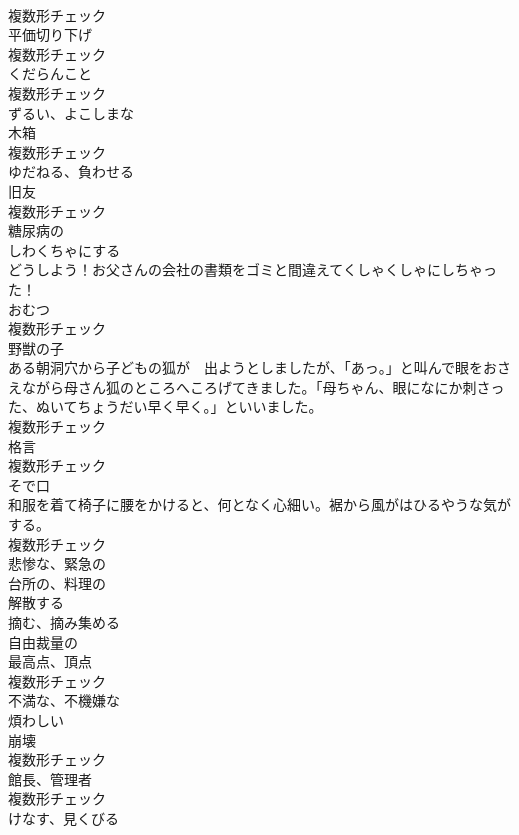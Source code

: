 \documentclass[8pt]{extreport}
\begin{document}
\begin{CJK}{UTF8}{min}
\\	複数形チェック
\\	[名詞]	平価切り下げ	
\\	複数形チェック
\\	[名詞]	くだらんこと	
\\	複数形チェック
\\	[形容詞]	ずるい、よこしまな	
\\	[名詞]	木箱	
\\	複数形チェック
\\	[動詞]	ゆだねる、負わせる	
\\	[名詞]	旧友	
\\	複数形チェック
\\	[形容詞]	糖尿病の	
\\	[動詞]	しわくちゃにする	
\\	どうしよう！お父さんの会社の書類をゴミと間違えてくしゃくしゃにしちゃった！	
\\	[名詞]	おむつ	
\\	複数形チェック
\\	[名詞]	野獣の子	
\\	ある朝洞穴から子どもの狐が　出ようとしましたが、「あっ。」と叫んで眼をおさえながら母さん狐のところへころげてきました。「母ちゃん、眼になにか刺さった、ぬいてちょうだい早く早く。」といいました。	
\\	複数形チェック
\\	[名詞]	格言	
\\	複数形チェック
\\	[名詞]	そで口	
\\	和服を着て椅子に腰をかけると、何となく心細い。裾から風がはひるやうな気がする。	
\\	複数形チェック
\\	[形容詞]	悲惨な、緊急の	
\\	[形容詞]	台所の、料理の	
\\	[動詞]	解散する	
\\	[動詞]	摘む、摘み集める	
\\	[形容詞]	自由裁量の	
\\	[名詞]	最高点、頂点	
\\	複数形チェック
\\	[形容詞]	不満な、不機嫌な	
\\	[形容詞]	煩わしい	
\\	[名詞]	崩壊	
\\	複数形チェック
\\	[名詞]	館⻑、管理者	
\\	複数形チェック
\\	[動詞]	けなす、見くびる	

\end{CJK}
\end{document}
